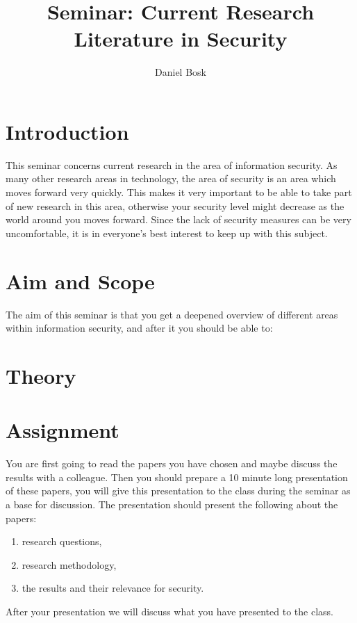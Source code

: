 \documentclass[a4paper]{article}
\title{Seminar: Current Research Literature in Security}
\author{%
  Daniel Bosk
}
\institute{%
  Department of Information and Communication Systems\\
  Mid Sweden University, Sundsvall
}
\begin{document}
\maketitle


\section{Introduction}%
\label{sec:Introduction}

This seminar concerns current research in the area of information security.
As many other research areas in technology, the area of security is an area 
which moves forward very quickly.
This makes it very important to be able to take part of new research in this 
area, otherwise your security level might decrease as the world around you 
moves forward.
Since the lack of security measures can be very uncomfortable, it is in 
everyone's best interest to keep up with this subject.


\section{Aim and Scope}%
\label{sec:Syfte}

The aim of this seminar is that you get a deepened overview of different areas 
within information security, and after it you should be able to:
\begin{itemize}
	
\end{itemize}


\section{Theory}%
\label{sec:Theory}




\section{Assignment}

You are first going to read the papers you have chosen and maybe discuss the 
results with a colleague.
Then you should prepare a 10 minute long presentation of these papers, you will 
give this presentation to the class during the seminar as a base for 
discussion.
The presentation should present the following about the papers:
\begin{enumerate}
  \item research questions,
  \item research methodology,
  \item the results and their relevance for security.
\end{enumerate}
After your presentation we will discuss what you have presented to the class.
\end{document}
